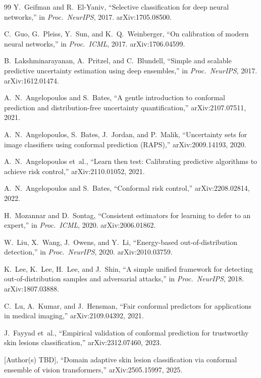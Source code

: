 \documentclass[conference]{IEEEtran}
\newcommand{\1}{\mathbf{1}}
\begin{document}
\begin{thebibliography}{99}
Y.~Geifman and R.~El-Yaniv,
``Selective classification for deep neural networks,''
in \emph{Proc.\ NeurIPS}, 2017. arXiv:1705.08500.

C.~Guo, G.~Pleiss, Y.~Sun, and K.~Q.~Weinberger,
``On calibration of modern neural networks,''
in \emph{Proc.\ ICML}, 2017. arXiv:1706.04599.

B.~Lakshminarayanan, A.~Pritzel, and C.~Blundell,
``Simple and scalable predictive uncertainty estimation using deep ensembles,''
in \emph{Proc.\ NeurIPS}, 2017. arXiv:1612.01474.

A.~N.~Angelopoulos and S.~Bates,
``A gentle introduction to conformal prediction and distribution-free
uncertainty quantification,''
arXiv:2107.07511, 2021.

A.~N.~Angelopoulos, S.~Bates, J.~Jordan, and P.~Malik,
``Uncertainty sets for image classifiers using conformal prediction (RAPS),''
arXiv:2009.14193, 2020.

A.~N.~Angelopoulos et~al.,
``Learn then test: Calibrating predictive algorithms to achieve risk control,''
arXiv:2110.01052, 2021.

A.~N.~Angelopoulos and S.~Bates,
``Conformal risk control,''
arXiv:2208.02814, 2022.

H.~Mozannar and D.~Sontag,
``Consistent estimators for learning to defer to an expert,''
in \emph{Proc.\ ICML}, 2020. arXiv:2006.01862.

W.~Liu, X.~Wang, J.~Owens, and Y.~Li,
``Energy-based out-of-distribution detection,''
in \emph{Proc.\ NeurIPS}, 2020. arXiv:2010.03759.

K.~Lee, K.~Lee, H.~Lee, and J.~Shin,
``A simple unified framework for detecting out-of-distribution samples
and adversarial attacks,''
in \emph{Proc.\ NeurIPS}, 2018. arXiv:1807.03888.

C.~Lu, A.~Kumar, and J.~Hensman,
``Fair conformal predictors for applications in medical imaging,''
arXiv:2109.04392, 2021.

J.~Fayyad et~al.,
``Empirical validation of conformal prediction for trustworthy skin
lesions classification,''
arXiv:2312.07460, 2023.

[Author(s) TBD],
``Domain adaptive skin lesion classification via conformal ensemble
of vision transformers,''
arXiv:2505.15997, 2025.


\end{thebibliography}
\end{document}
